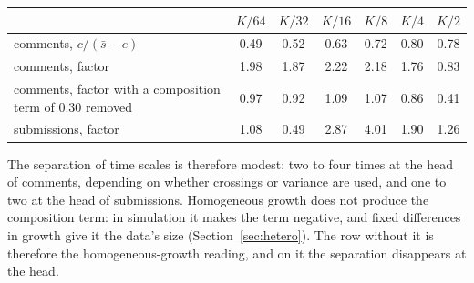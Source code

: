 \documentclass[10pt]{article}
\begin{document}
\begin{center}\small\begin{tabular}{lcccccc}
\toprule
 & $K/64$ & $K/32$ & $K/16$ & $K/8$ & $K/4$ & $K/2$\\
\midrule
comments, $c/(\bar s - e)$ & 0.49 & 0.52 & 0.63 & 0.72 & 0.80 & 0.78\\
comments, factor & 1.98 & 1.87 & 2.22 & 2.18 & 1.76 & 0.83\\
comments, factor with a composition term of 0.30 removed & 0.97 & 0.92 & 1.09 & 1.07 & 0.86 & 0.41\\
submissions, factor & 1.08 & 0.49 & 2.87 & 4.01 & 1.90 & 1.26\\
\bottomrule
\end{tabular}\end{center}
The separation of time scales is therefore modest: two to four times at the head of comments, depending on whether crossings or variance are used, and one to two at the head of submissions. Homogeneous growth does not produce the composition term: in simulation it makes the term negative, and fixed differences in growth give it the data's size (Section~\ref{sec:hetero}). The row without it is therefore the homogeneous-growth reading, and on it the separation disappears at the head.
\end{document}
